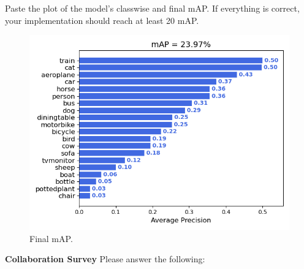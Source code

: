 \documentclass[11pt,addpoints,answers]{exam}
\numberwithin{equation}{section} %
\numberwithin{figure}{section} %
\numberwithin{table}{section} %
\begin{document}
\begin{questions}
\question Paste the plot of the model's classwise and final mAP. If everything is correct, your implementation should reach at least 20 mAP.

\begin{figure}[H]
    \centering
    \includegraphics{./results/q3/mAP.png}
    \caption{Final mAP.}
    \label{fig:final_mAP}
\end{figure}
\end{questions}



\clearpage

\textbf{Collaboration Survey} Please answer the following:
\end{document}
